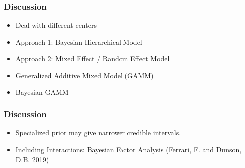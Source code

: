 \documentclass{beamer}
\begin{document}
\begin{frame}
\frametitle{Discussion}

\begin{itemize}

\item Deal with different centers
\pause
\item Approach 1: Bayesian Hierarchical Model
\pause
\item Approach 2: Mixed Effect / Random Effect Model
\pause
\item Generalized Additive Mixed Model (GAMM)
\item Bayesian GAMM 


\end{itemize}
\end{frame}


\begin{frame}
\frametitle{Discussion}

\begin{itemize}


\item Specialized prior may give narrower credible intervals.
\pause
\item Including Interactions: Bayesian Factor Analysis (Ferrari, F. and Dunson, D.B. 2019)



\end{itemize}
\end{frame}
\end{document}
